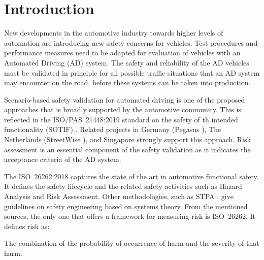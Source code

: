 \section{Introduction}


New developments in the automotive industry towards higher levels of automation are introducing new safety concerns for vehicles. Test procedures and performance measures need to be adapted for evaluation of vehicles with an Automated Driving (AD) system. The safety and reliability of the AD vehicles must be validated in principle for all possible traffic situations that an AD system may encounter on the road, before these systems can be taken into production.

Scenario-based safety validation for automated driving is one of the proposed approaches that is broadly supported by the automotive community. This is reflected in the ISO/PAS~21448:2019 standard on the safety of th intended functionality (SOTIF) \cite{ISO21448}. Related projects in Germany (Pegasus \cite{putz2017pegasus}), The Netherlands (StreetWise \cite{elrofai2018scenario}), and Singapore \cite{ploeg2018cetran} strongly support this approach. Risk assessment is an essential component of the safety validation as it indicates the acceptance criteria of the AD system.

The ISO~26262:2018 \cite{ISO26262} captures the state of the art in automotive functional safety. It defines the safety lifecycle and the related safety activities such as Hazard Analysis and Risk Assessment. Other methodologies, such as STPA \cite{leveson2013stpa}, give guidelines on safety engineering based on systems theory. From the mentioned sources, the only one that offers a framework for measuring risk is ISO~26262. It defines risk as:
\begin{definition}
	The combination of the probability of occurrence of harm and the severity of that harm.
\end{definition}

